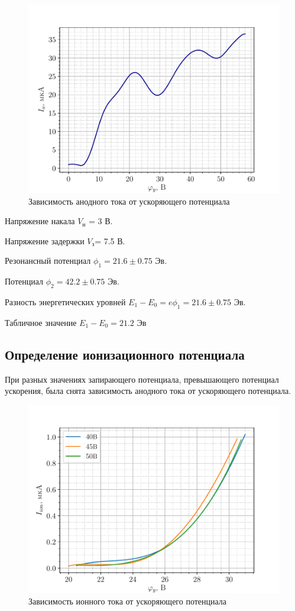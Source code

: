 \begin{figure}[H]
    \centering
    \includegraphics[width=\linewidth]{fig/1}
    \caption{Зависимость анодного тока от ускоряющего потенциала}
    \label{fig:4}
\end{figure}

Напряжение накала $V_{\text{н}}$ = 3 В.

Напряжение задержки $V_{\text{з}}$= 7.5 В.

Резонансный потенциал $\phi_1=21.6\pm 0.75$ Эв.

Потенциал $\phi_2=42.2 \pm 0.75$ Эв.

Разность энергетических уровней $E_1-E_0=e\phi_1=21.6\pm 0.75$ Эв.

Табличное значение $E_1-E_0=21.2$ Эв
\subsection{Определение ионизационного потенциала}
 При разных значениях запирающего потенциала, превышающего потенциал ускорения, была снята зависимость анодного тока от
  ускоряющего потенциала. 



\begin{figure}[H]
    \centering
    \includegraphics[width=\linewidth]{fig/2}
    \caption{Зависимость ионного тока от ускоряющего потенциала}
    \label{fig:5}
\end{figure}

